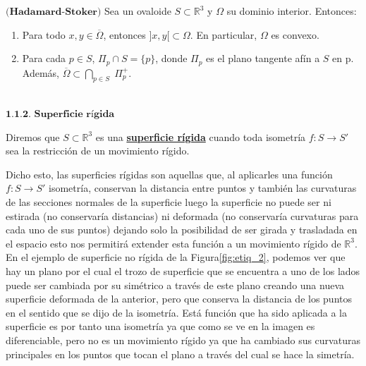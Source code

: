 \begin{teorema} \label{teo:hadamard}
	$\textbf{(Hadamard-Stoker)}$ Sea un ovaloide $S \subset \mathbb{R}^3$ y $\Omega$ su dominio interior. Entonces:
	
	\begin{enumerate}
		\item Para todo $x, y \in \overline{\Omega}$, entonces $]x, y[ \subset \Omega$. En particular, $\Omega$ es convexo.
		\item Para cada $p \in S$, $\Pi_p \cap S = \{p\}$, donde $\Pi_p$ es el plano tangente afín a $S$ en p. Además, $\overline{\Omega} \subset \bigcap_{p \in S} \; \Pi^{+}_{p}$.
	\end{enumerate}
\end{teorema}


${ }$\\
$\textbf{1.1.2. Superficie rígida}$
${ }$\\

\begin{definicion}
	Diremos que $S \subset \mathbb{R}^3$ es una \underline{\textbf{superficie rígida}} cuando toda isometría $f : S \to S'$ sea la restricción de un movimiento rígido.
\end{definicion}

Dicho esto, las superficies rígidas son aquellas que, al aplicarles una función $f : S \to S'$ isometría, conservan la distancia entre puntos y también las curvaturas de las secciones normales de la superficie luego la superficie no puede ser ni estirada (no conservaría distancias) ni deformada (no conservaría curvaturas para cada uno de sus puntos) dejando solo la posibilidad de ser girada y trasladada en el espacio esto nos permitirá extender esta función a un movimiento rígido de $\mathbb{R}^3$.
${ }$\\



En el ejemplo de superficie no rígida de la Figura\ref{fig:etiq_2}, podemos ver que hay un plano por el cual el trozo de superficie que se encuentra a uno de los lados puede ser cambiada por su simétrico a través de este plano creando una nueva superficie deformada de la anterior, pero que conserva la distancia de los puntos en el sentido que se dijo de la isometría. Está función que ha sido aplicada a la superficie es por tanto una isometría ya que como se ve en la imagen es diferenciable, pero no es un movimiento rígido ya que ha cambiado sus curvaturas principales en los puntos que tocan el plano a través del cual se hace la simetría.

